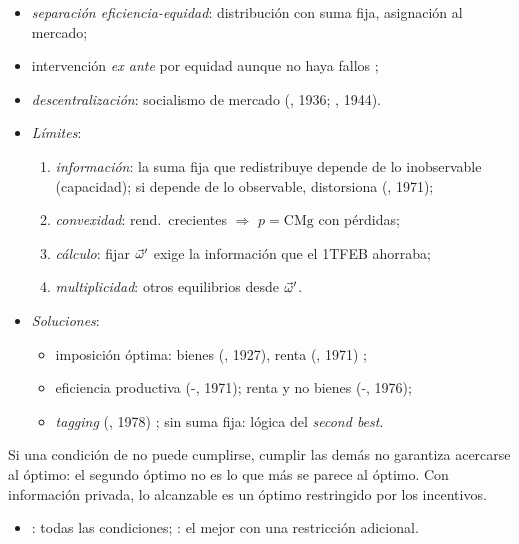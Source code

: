 \documentclass{article}
\begin{document}
\begin{columnas}
\begin{itemize}
  \begin{itemize}
  \item \emph{separación eficiencia-equidad}: distribución con suma fija, asignación al mercado;
  \item intervención \emph{ex ante} por equidad aunque no haya fallos ;
  \item \emph{descentralización}: socialismo de mercado (, 1936; , 1944).
  \end{itemize}
\end{itemize}
\begin{itemize}
\item \emph{Límites}:
  \begin{enumerate}
  \item \emph{información}: la suma fija que redistribuye depende de lo inobservable (capacidad); si depende de lo observable, distorsiona (, 1971);
  \item \emph{convexidad}: rend.\ crecientes $\Rightarrow$ $p=\mathrm{CMg}$ con pérdidas;
  \item \emph{cálculo}: fijar $\vec{\omega}'$ exige la información que el 1TFEB ahorraba;
  \item \emph{multiplicidad}: otros equilibrios desde $\vec{\omega}'$.
  \end{enumerate}
\item \emph{Soluciones}:
  \begin{itemize}
  \item imposición óptima: bienes (, 1927), renta (, 1971) ;
  \item eficiencia productiva (-, 1971); renta y no bienes (-, 1976);
  \item \emph{tagging} (, 1978) ; sin suma fija: lógica del \emph{second best}.
  \end{itemize}
\end{itemize}

\begin{ideaclave}
Si una condición de  no puede cumplirse, cumplir las demás no garantiza acercarse al óptimo: el segundo óptimo no es lo que más se parece al óptimo. Con información privada, lo alcanzable es un óptimo restringido por los incentivos.
\end{ideaclave}
\begin{itemize}
\item {}: todas las condiciones; : el mejor con una restricción adicional.
\end{itemize}


\end{columnas}
\end{document}
